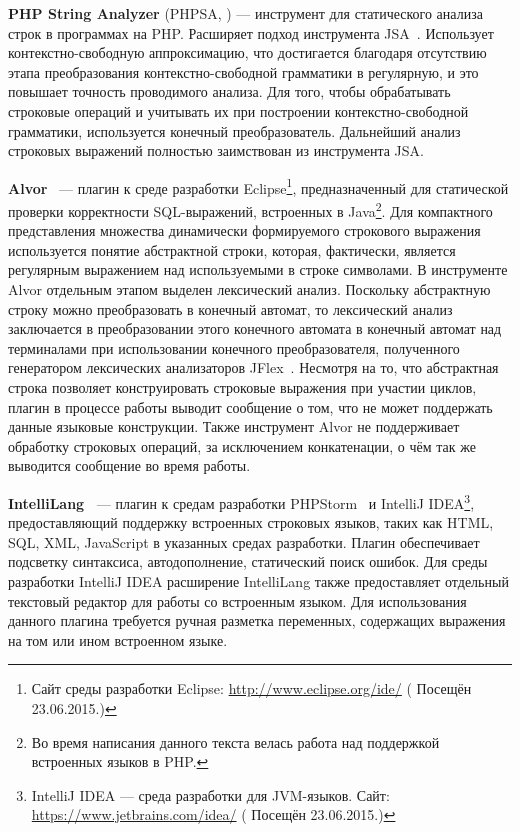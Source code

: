 \textbf{PHP String Analyzer} (PHPSA, \cite{PHPSA, PHPSAUrl}) {---} инструмент для статического анализа строк в программах на PHP. Расширяет подход инструмента JSA~\cite{JSA}. Использует контекстно-свободную аппроксимацию, что достигается благодаря отсутствию этапа преобразования контекстно-свободной грамматики в регулярную, и это повышает точность проводимого анализа. Для того, чтобы обрабатывать строковые операций и учитывать их при построении контекстно-свободной грамматики, используется конечный преобразователь. Дальнейший анализ строковых выражений полностью заимствован из инструмента JSA.

\textbf{Alvor}~\cite{Alvor1, Alvor2, AlvorUrl} {---} плагин к среде разработки Eclipse\footnote{Сайт среды разработки Eclipse: \url{http://www.eclipse.org/ide/} ( Посещён 23.06.2015.)}, предназначенный для статической проверки корректности SQL-выражений, встроенных в Java\footnote{Во время написания данного текста велась работа над поддержкой встроенных языков в PHP.}. Для компактного представления множества динамически формируемого строкового выражения используется понятие абстрактной строки, которая, фактически, является регулярным выражением над используемыми в строке символами. В инструменте Alvor отдельным этапом выделен лексический анализ. Поскольку абстрактную строку можно преобразовать в конечный автомат, то лексический анализ заключается в преобразовании этого конечного автомата в конечный автомат над терминалами при  использовании конечного преобразователя, полученного генератором лексических анализаторов JFlex~\cite{JFlex}. Несмотря на то, что абстрактная строка позволяет конструировать строковые выражения при участии циклов, плагин в процессе работы выводит сообщение  о том, что не может поддержать данные языковые конструкции. Также инструмент Alvor не поддерживает обработку строковых операций, за исключением конкатенации, о чём так же выводится сообщение во время работы.

\textbf{IntelliLang~\cite{IntelliLang}} --- плагин к средам разработки PHPStorm~\cite{PHPStorm} и IntelliJ IDEA\footnote{IntelliJ IDEA --- среда разработки для JVM-языков. Сайт: \url{https://www.jetbrains.com/idea/} ( Посещён 23.06.2015.)}, предоставляющий поддержку встроенных строковых языков, таких как HTML, SQL, XML, JavaScript в указанных средах разработки. Плагин обеспечивает подсветку синтаксиса, автодополнение, статический поиск ошибок. Для среды разработки IntelliJ IDEA расширение IntelliLang также предоставляет отдельный текстовый редактор для работы со встроенным языком. Для использования данного плагина требуется ручная разметка переменных, содержащих выражения на том или ином встроенном языке.
    
